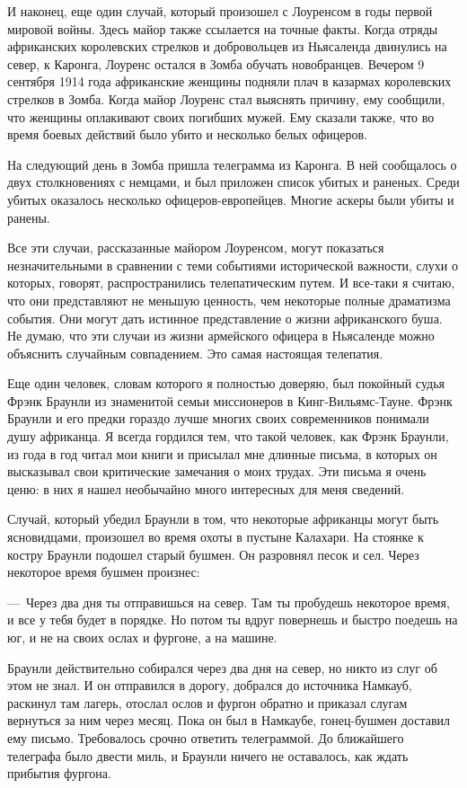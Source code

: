\documentclass[12pt,a4paper,twoside,openany,svgnames]{memoir}
\begin{document}
И наконец, еще один случай, который произошел с Лоуренсом в годы первой мировой войны. Здесь майор также ссылается на точные факты. Когда отряды африканских королевских стрелков и добровольцев из Ньясаленда двинулись на север, к Каронга, Лоуренс остался в Зомба обучать новобранцев. Вечером 9 сентября 1914 года африканские женщины подняли плач в казармах королевских стрелков в Зомба. Когда майор Лоуренс стал выяснять причину, ему сообщили, что женщины оплакивают своих погибших мужей. Ему сказали также, что во время боевых действий было убито и несколько белых офицеров.

На следующий день в Зомба пришла телеграмма из Каронга. В ней сообщалось о двух столкновениях с немцами, и был приложен список убитых и раненых. Среди убитых оказалось несколько офицеров-европейцев. Многие аскеры были убиты и ранены.

Все эти случаи, рассказанные майором Лоуренсом, могут показаться незначительными в сравнении с теми событиями исторической важности, слухи о которых, говорят, распространились телепатическим путем. И все-таки я считаю, что они представляют не меньшую ценность, чем некоторые полные драматизма события. Они могут дать истинное представление о жизни африканского буша. Не думаю, что эти случаи из жизни армейского офицера в Ньясаленде можно объяснить случайным совпадением. Это самая настоящая телепатия.

Еще один человек, словам которого я полностью доверяю, был покойный судья Фрэнк Браунли из знаменитой семьи миссионеров в Кинг-Вильямс-Тауне. Фрэнк Браунли и его предки гораздо лучше многих своих современников понимали душу африканца. Я всегда гордился тем, что такой человек, как Фрэнк Браунли, из года в год читал мои книги и присылал мне длинные письма, в которых он высказывал свои критические замечания о моих трудах. Эти письма я очень ценю: в них я нашел необычайно много интересных для меня сведений.

Случай, который убедил Браунли в том, что некоторые африканцы могут быть ясновидцами, произошел во время охоты в пустыне Калахари. На стоянке к костру Браунли подошел старый бушмен. Он разровнял песок и сел. Через некоторое время бушмен произнес:

---~Через два дня ты отправишься на север. Там ты пробудешь некоторое время, и все у тебя будет в порядке. Но потом ты вдруг повернешь и быстро поедешь на юг, и не на своих ослах и фургоне, а на машине.

Браунли действительно собирался через два дня на север, но никто из слуг об этом не знал. И он отправился в дорогу, добрался до источника Намкауб, раскинул там лагерь, отослал ослов и фургон обратно и приказал слугам вернуться за ним через месяц. Пока он был в Намкаубе, гонец-бушмен доставил ему письмо. Требовалось срочно ответить телеграммой. До ближайшего телеграфа было двести миль, и Браунли ничего не оставалось, как ждать прибытия фургона.
\end{document}

